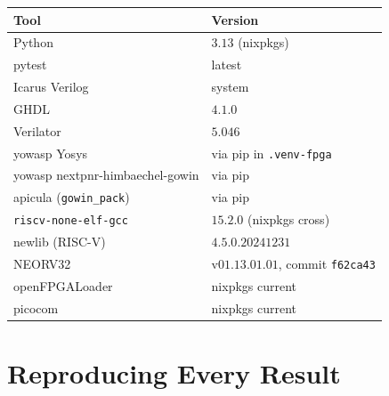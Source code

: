 \documentclass[11pt,a4paper]{article}
\begin{document}
\begin{center}
\begin{tabular}{ll}
\toprule
\rowcolor{tabhead!20}\textbf{Tool} & \textbf{Version}\\
\midrule
Python                            & $3.13$ (nixpkgs)\\
pytest                            & latest\\
Icarus Verilog                    & system\\
GHDL                              & $4.1.0$\\
Verilator                         & $5.046$\\
yowasp Yosys                      & via pip in \texttt{.venv-fpga}\\
yowasp nextpnr-himbaechel-gowin   & via pip\\
apicula (\texttt{gowin\_pack})    & via pip\\
\texttt{riscv-none-elf-gcc}       & $15.2.0$ (nixpkgs cross)\\
newlib (RISC-V)                   & $4.5.0.20241231$\\
NEORV32                           & v$01.13.01.01$, commit \texttt{f62ca43}\\
openFPGALoader                    & nixpkgs current\\
picocom                           & nixpkgs current\\
\bottomrule
\end{tabular}
\end{center}

\section{Reproducing Every Result}
\end{document}
